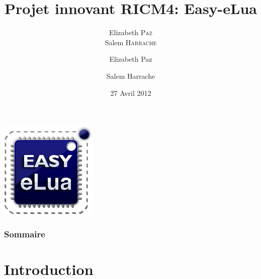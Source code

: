 \documentclass{beamer}
\title{Projet innovant RICM4: Easy-eLua}
\author{Elizabeth \textsc{Paz} \\ Salem \textsc{Harrache}}
\institute{Polytech'Grenoble \\
Olivier \textsc{Richard} \\
Didier \textsc{Donsez} \\
}
\author[Elizabeth Paz, Salem Harrache]
{Elizabeth Paz \and Salem Harrache}
\date{27 Avril 2012}
\begin{document}
\begin{frame}
\begin{center}
\includegraphics[scale=0.4]{../images/easy_elua_logo}
\end{center}
\titlepage
\end{frame}

\begin{frame}
\frametitle{Sommaire}
\tableofcontents
\end{frame}

\section{Introduction}
\end{document}
